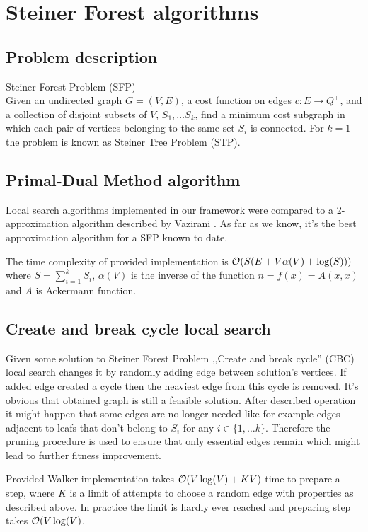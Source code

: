 \chapter{Steiner Forest algorithms}

\section{Problem description}
Steiner Forest Problem (SFP)\\
Given an undirected graph $G = (V, E)$, a cost function on edges $c : E \rightarrow Q^+$, and a collection of disjoint subsets of $V$, $S_1, \dots S_k$, find a minimum cost subgraph in which each pair of vertices belonging to the same set $S_i$ is connected.
For $k = 1$ the problem is known as Steiner Tree Problem (STP).

\section{Primal-Dual Method algorithm}
Local search algorithms implemented in our framework were compared to a 2-approximation algorithm described by Vazirani \cite{Vazirani}. As far as we know, it's the best approximation algorithm for a SFP known to date.

The time complexity of provided implementation is $\mathcal{O}(S(E + V\alpha(V) + \log(S)))$ where $S = \sum_{i = 1}^{k}S_i$, $\alpha(V)$ is the inverse of the function $n = f(x) = A(x, x)$ and $A$ is Ackermann function.

\section{Create and break cycle local search}
Given some solution to Steiner Forest Problem ,,Create and break cycle'' (CBC) local search changes it by randomly adding edge between solution's vertices. If added edge created a cycle then the heaviest edge from this cycle is removed. It's obvious that obtained graph is still a feasible solution. After described operation it might happen that some edges are no longer needed like for example edges adjacent to leafs that don't belong to $S_i$ for any $i \in \{1, \dots k\}$. Therefore the pruning procedure is used to ensure that only essential edges remain which might lead to further fitness improvement.

Provided Walker implementation takes $\mathcal{O}(V\log(V) + KV)$ time to prepare a step, where $K$ is a limit of attempts to choose a random edge with properties as described above. In practice the limit is hardly ever reached and preparing step takes $\mathcal{O}(V\log(V)$.

